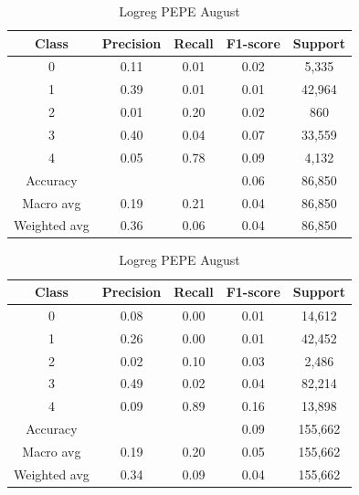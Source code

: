\begin{enumerate}
        \begin{table}[H]
        \centering
        \scriptsize
        \begin{minipage}{0.48\textwidth}
        \centering
        \begin{tabular}{c|cccc}
        \hline
        Class & Precision & Recall & F1-score & Support \\
        \hline
        0 & 0.11 & 0.01 & 0.02 & 5,335 \\
        1 & 0.39 & 0.01 & 0.01 & 42,964 \\
        2 & 0.01 & 0.20 & 0.02 & 860 \\
        3 & 0.40 & 0.04 & 0.07 & 33,559 \\
        4 & 0.05 & 0.78 & 0.09 & 4,132 \\
        \hline
        Accuracy &       &      & 0.06 & 86,850 \\
        Macro avg & 0.19 & 0.21 & 0.04 & 86,850 \\
        Weighted avg & 0.36 & 0.06 & 0.04 & 86,850 \\
        \hline
        \end{tabular}
        \caption{Logreg DOGE August}
        \label{tab:classifier_1_report_logreg_doge_filtered_aug}
        \end{minipage}
        \hfill
        \begin{minipage}{0.48\textwidth}
        \centering
        \begin{tabular}{c|cccc}
        \hline
        Class & Precision & Recall & F1-score & Support \\
        \hline
        0 & 0.08 & 0.00 & 0.01 & 14,612 \\
        1 & 0.26 & 0.00 & 0.01 & 42,452 \\
        2 & 0.02 & 0.10 & 0.03 & 2,486 \\
        3 & 0.49 & 0.02 & 0.04 & 82,214 \\
        4 & 0.09 & 0.89 & 0.16 & 13,898 \\
        \hline
        Accuracy &       &      & 0.09 & 155,662 \\
        Macro avg & 0.19 & 0.20 & 0.05 & 155,662 \\
        Weighted avg & 0.34 & 0.09 & 0.04 & 155,662 \\
        \hline
        \end{tabular}
        \caption{Logreg PEPE August}
        \label{tab:classifier_1_report_logreg_pepe_filtered_aug}
        \end{minipage}
        

\end{table}
\end{enumerate}
